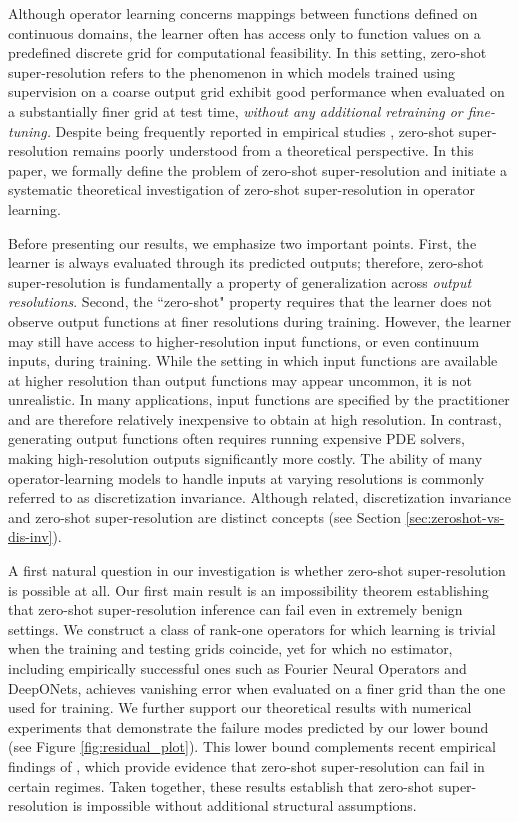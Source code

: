 \documentclass[11pt]{article}
\theoremstyle{plain}
\begin{document}
Although operator learning concerns mappings between functions defined on continuous domains, the learner often has access only to function values on a predefined discrete grid for computational feasibility. In this setting, zero-shot super-resolution refers to the phenomenon in which models trained using supervision on a coarse output grid exhibit good performance when evaluated on a substantially finer grid at test time, \emph{without any additional retraining or fine-tuning.}  Despite being frequently reported in empirical studies \citep{jiang2023efficient, yang2024fourier, sinha2025effectiveness}, zero-shot super-resolution remains poorly understood from a theoretical perspective. In this paper, we formally define the problem of zero-shot super-resolution and initiate a systematic theoretical investigation of zero-shot super-resolution in operator learning.


Before presenting our results, we emphasize two important points. First, the learner is always evaluated through its predicted
outputs; therefore, zero-shot super-resolution is fundamentally a property of generalization across
\emph{output resolutions}. Second, the  ``zero-shot" property requires that the learner does not
observe output functions at finer resolutions during training. However, the learner may still have
access to higher-resolution input functions, or even continuum inputs, during training. 
While the setting in which input functions are available at higher resolution than output functions
may appear uncommon, it is not unrealistic. In many applications, input functions are specified by
the practitioner and are therefore relatively inexpensive to obtain at high resolution. In contrast,
generating output functions often requires running expensive PDE solvers, making high-resolution
outputs significantly more costly. The ability of many operator-learning models to handle inputs at varying resolutions is commonly
referred to as discretization invariance. Although related, discretization invariance and zero-shot
super-resolution are distinct concepts (see Section \ref{sec:zeroshot-vs-dis-inv}). 
 
 


A first natural question in our investigation is whether zero-shot super-resolution is possible at all. Our first main result is an impossibility theorem establishing that zero-shot super-resolution inference can fail even in extremely benign settings. We construct a class of rank-one operators for which learning is trivial when the training and testing grids coincide, yet for which no estimator, including empirically successful ones such as Fourier Neural Operators and DeepONets, achieves vanishing error when evaluated on a finer grid than the one used for training. We further support our theoretical results with numerical experiments that demonstrate the failure modes predicted by our lower bound (see Figure \ref{fig:residual_plot}). This lower bound complements recent empirical findings of \citep{gao2025discretization, sakarvadia2025false}, which provide evidence that zero-shot super-resolution can fail in certain regimes. Taken together, these results establish that zero-shot super-resolution is impossible without additional structural assumptions.
\end{document}
